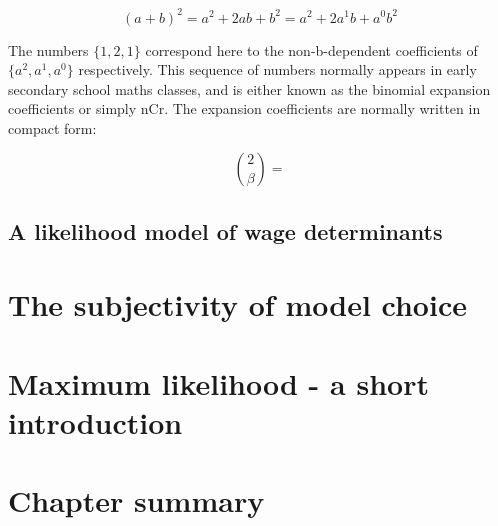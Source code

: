 \documentclass[11pt,fullpage]{book}
\begin{document}
\begin{equation}
(a+b)^2 = a^2 + 2ab + b^2 = a^2 + 2a^1b + a^0b^2
\end{equation}\label{eq:Likelihood_quadratic}

The numbers $\{1,2,1\}$ correspond here to the non-b-dependent coefficients of $\{a^2,a^1,a^0\}$ respectively. This sequence of numbers normally appears in early secondary school maths classes, and is either known as the binomial expansion coefficients or simply nCr. The expansion coefficients are normally written in compact form:

\begin{equation}
{2 \choose \beta} = 
\end{equation}\label{eq:Likelihood_nCr}


\subsection{A likelihood model of wage determinants}


\section{The subjectivity of model choice}
\section{Maximum likelihood - a short introduction}
\section{Chapter summary}




\end{document}

